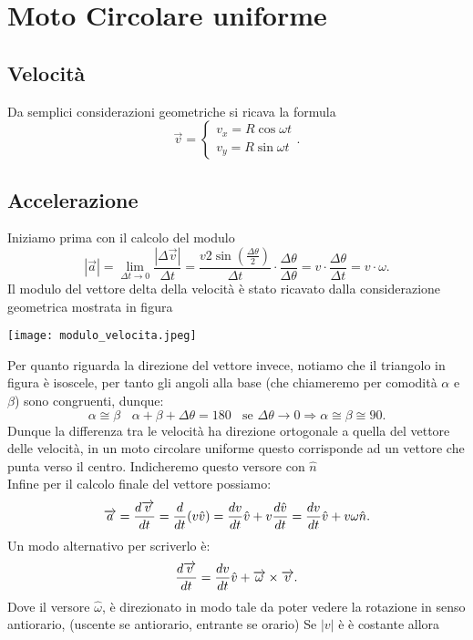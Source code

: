 \documentclass[12px]{article}
\begin{document}
	\section{Moto Circolare uniforme}
	\subsection{Velocità}
	Da semplici considerazioni geometriche si ricava la formula
	\[
	\overrightarrow{v} = \begin{cases}
		v_x = R\cos\omega t\\
		v_y = R\sin\omega t
	\end{cases}
	.\] 
	\subsection{Accelerazione}
	Iniziamo prima con il calcolo del modulo
	\[
	|\overrightarrow{a}| = \lim_{\Delta t \rightarrow 0} \frac {|\Delta \overrightarrow{v}|}{\Delta t} = \frac {v2\sin(\frac{\Delta\theta}2)}{\Delta t} \cdot \frac {\Delta\theta}{\Delta\theta} = v\cdot \frac {\Delta\theta}{\Delta t} = v\cdot\omega
	.\] 
	Il modulo del vettore delta della velocità è stato ricavato dalla considerazione geometrica mostrata in figura
	\begin{center}
		\texttt{[image: modulo\_velocita.jpeg]}
	\end{center}
	Per quanto riguarda la direzione del vettore invece, notiamo che il triangolo in figura è isoscele, per tanto gli angoli alla base (che chiameremo per comodità $\alpha$ e $\beta$) sono congruenti, dunque:
	\[
		\alpha \cong \beta \ \ \ \ \alpha + \beta + \Delta\theta = 180 \ \ \ \ \text {se } \Delta\theta \rightarrow 0 \Rightarrow \alpha \cong\beta \cong 90
	.\] 
	Dunque la differenza tra le velocità ha direzione ortogonale a quella del vettore delle velocità, in un moto circolare uniforme questo corrisponde ad un vettore che punta verso il centro. Indicheremo questo versore con $\hat n$\\
	Infine per il calcolo finale del vettore possiamo:
	\[
		\overrightarrow{a} = \frac{d \overrightarrow{v}}{d t} = \frac{d }{d t} (v \hat v) = \frac{d v}{d t} \hat v + v \frac{d \hat v}{d t} = \frac{d v}{d t} \hat v + v\omega \hat n
	.\] 
	Un modo alternativo per scriverlo è:
	\[
		\frac{d  \overrightarrow{v}}{d t} = \frac{d v}{d t} \hat v + \overrightarrow \omega \times \overrightarrow{v}
	.\]
	Dove il versore $\hat \omega$, è direzionato in modo tale da poter vedere la rotazione in senso antiorario, (uscente se antiorario, entrante se orario)
	Se $|v|$ è  è costante allora
\end{document}
